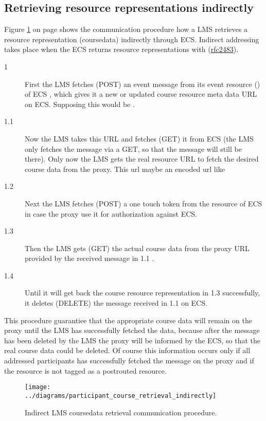 \subsection{Retrieving resource representations indirectly}
Figure \ref{fig:participant_coursedata_retrieval_indirectly} on page
\pageref{fig:participant_coursedata_retrieval_indirectly} shows the
communication procedure how a LMS retrieves a resource representation
(coursedata) indirectly through ECS. Indirect addressing takes place when the
ECS returns resource representations with  
(\href{http://tools.ietf.org/html/rfc2483#section-5}{rfc2483}).
\begin{description}
  \item[1] First the LMS fetches (POST)  an event message from its event resource
  () of ECS , which gives it a new or updated course
  resource meta data URL on ECS. Supposing this would be .
  \item[1.1] Now the LMS takes this URL and fetches (GET) it from ECS (the LMS
  only fetches the message via a GET, so that the message will still be there).
  Only now the LMS gets the real resource URL to fetch the desired course data
  from the proxy. This url maybe an encoded url like 
  \item[1.2] Next the LMS fetches (POST) a one touch token from the 
  resource of ECS in case the proxy use it for authorization against ECS.
  \item[1.3] Then the LMS gets (GET) the actual course data from the proxy URL
  provided by the received message in 1.1 . 
  \item[1.4] Until it will get back the course resource representation in 1.3
  successfully, it deletes (DELETE) the message 
  received in 1.1 on ECS.
\end{description}
This procedure guarantiee that the appropriate course data will remain on the
proxy until the LMS has successfully fetched the data, because after the
message  has been deleted by the LMS the proxy
will be informed by the ECS, so that the real course data  could be deleted.
Of course this information occurs only if all addressed participants has
successfully fetched the message on the proxy and if the
 resource is not tagged as a postrouted resource. 

\begin{figure}[p]
\noindent \begin{centering}
\texttt{[image: ../diagrams/participant\_course\_retrieval\_indirectly]}
\par\end{centering}
\caption[Indirect LMS coursedata
retrieval]{\label{fig:participant_coursedata_retrieval_indirectly}Indirect LMS
coursedata retrieval communication procedure.}
\end{figure}
